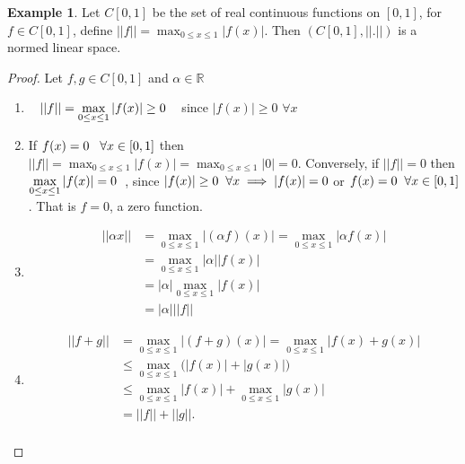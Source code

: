 \documentclass[11pt,a4paper]{article}
\theoremstyle{definition}
\newtheorem{exa}[thm]{Example}
\begin{document}
\begin{exa}
Let $C[0,1]$ be the set of real continuous functions on $[0,1]$, for $f\in C[0,1]$, define \hspace{0.3cm}$\displaystyle{||f||=\max_{0\leq x\leq 1}|f(x)|}.$ Then $(C[0,1],||.||)$ is a normed linear space.

\end{exa}

\begin{proof}
Let $f,g\in C[0,1]$ and $\alpha \in \mathbb{R}$
\begin{enumerate}
\item[i] $\hspace{0.3cm}\displaystyle{||f||=\max_{0\leq x\leq 1}|f(x)|\geq 0}\hspace{0.3cm}$ since $|f(x)|\geq 0$ $\forall x$
\item[ii] If $f(x)=0\hspace{0.3cm} \forall x\in [0,1]$ then \hspace{0.3cm}$\displaystyle{||f||=\max_{0\leq x\leq 1}|f(x)|=\max_{0\leq x\leq 1}|0|=0}.$ Conversely, if $||f||=0$ then \hspace{0.3cm}$\displaystyle{\max_{0\leq x\leq 1}|f(x)|=0}\hspace{0.2cm}$, since $|f(x)|\geq 0\hspace{0.2cm}\forall x\implies |f(x)|=0$ or $f(x)=0\hspace{0.2cm} \forall x\in [0,1]$. That is $f=0$, a zero function.
\item[iii] 
\begin{align*}
||\alpha x|| &=\max_{0\leq x\leq 1}\Big|(\alpha f)(x)\Big|
              =\max_{0\leq x\leq 1}\Big|\alpha f(x)\Big|\\
             &=\max_{0\leq x\leq 1}|\alpha||f(x)|\\
             &=|\alpha|\max_{0\leq x\leq 1}|f(x)|\\
             &=|\alpha|||f||
\end{align*}
\item[iv]
\begin{align*}
||f+g|| &=\max_{0\leq x\leq 1}\Big|(f+g)(x)\Big|
         =\max_{0\leq x\leq 1}\Big|f(x)+g(x)\Big|\\
        &\leq \max_{0\leq x\leq 1}\Big(|f(x)|+|g(x)|\Big)\\
        &\leq \max_{0\leq x\leq 1}|f(x)|+\max_{0\leq x\leq 1}|g(x)|\\
        &=||f||+||g||.\\
\end{align*}
\end{enumerate}


\pagebreak
\end{proof}
\end{document}
